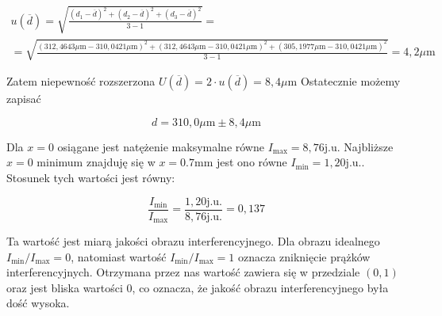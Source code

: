 \documentclass{fizykalab}
\newcommand{\mm}{\ensuremath{\text{mm}}}
\newcommand{\um}{\ensuremath{\mu \text{m}}}
\newcommand{\ju}{\ensuremath{\text{j.u.}}}
\begin{document}
\begin{multline*}
    u(\overline{d}) = \sqrt{
         \frac{
             \left(d_1- \overline{d} \right)^2 + 
             \left(d_2- \overline{d} \right)^2 + 
             \left(d_3- \overline{d} \right)^2 
         }{3-1}} = \\ = 
         \sqrt{\frac{
             \left(312,4643 \um - 310,0421 \um \right)^2 + 
             \left(312,4643 \um - 310,0421 \um \right)^2 + 
             \left(305,1977 \um - 310,0421\um \right)^2 
         }{3-1}} = 4,2 \um
\end{multline*}

Zatem niepewność rozszerzona $U(\overline{d}) = 2\cdot u(\overline{d}) = 8,4 \um$
Ostatecznie możemy zapisać 

\begin{equation*}
    d = 310,0\um \pm 8,4\um 
\end{equation*}


Dla $x = 0$ osiągane jest natężenie maksymalne równe $I_\text{max} = 8,76 \ju$
Najbliższe $x=0$ minimum znajduję się w $x = 0.7 \mm$ jest ono równe
$I_\text{min} = 1,20 \ju$. Stosunek tych wartości jest równy:

\begin{equation*}
\frac{I_\text{min}}{I_\text{max}} = \frac{1,20 \ju}{8,76 \ju} = 0,137
\end{equation*}

Ta wartość jest miarą jakości obrazu interferencyjnego. Dla obrazu idealnego 
$I_\text{min} / I_\text{max} = 0$, natomiast wartość  $I_\text{min} / I_\text{max} = 1$
oznacza zniknięcie prążków interferencyjnych.
Otrzymana przez nas wartość zawiera się w przedziale $(0,1)$ oraz jest bliska wartości $0$,
co oznacza, że jakość obrazu interferencyjnego była dość wysoka.
\end{document}
